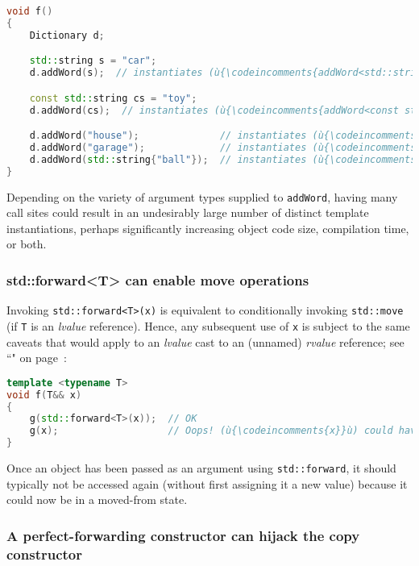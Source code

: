 \begin{lstlisting}[language=C++]
void f()
{
    Dictionary d;

    std::string s = "car";
    d.addWord(s);  // instantiates (ù{\codeincomments{addWord<std::string\&>}}ù)

    const std::string cs = "toy";
    d.addWord(cs);  // instantiates (ù{\codeincomments{addWord<const std::string\&>}}ù)

    d.addWord("house");              // instantiates (ù{\codeincomments{addWord<char const(\&)[6]>}}ù)
    d.addWord("garage");             // instantiates (ù{\codeincomments{addWord<char const(\&)[7]>}}ù)
    d.addWord(std::string{"ball"});  // instantiates (ù{\codeincomments{addWord<std::string\&\&>}}ù)
}
\end{lstlisting}
    
\noindent Depending on the variety of argument types supplied to \texttt{addWord},
having many call sites could result in an undesirably large number of
distinct template instantiations, perhaps significantly increasing
object code size, compilation time, or both.

\subsubsection[{\tt std::forward<T>} can enable move operations]{{\SubsubsecCode std::forward<T>} can enable move operations}\label{std::forward<t>-can-enable-move-operations}

Invoking \texttt{std::forward<T>(x)} is equivalent to conditionally
invoking \texttt{std::move} (if \texttt{T} is an
\emph{lvalue} reference). Hence, any subsequent use of \texttt{x} is
subject to the same caveats that would apply to an \emph{lvalue} cast to
an (unnamed) \emph{rvalue} reference; see ``" on page~\pageref{Rvalue-References}:

\begin{lstlisting}[language=C++]
template <typename T>
void f(T&& x)
{
    g(std::forward<T>(x));  // OK
    g(x);                   // Oops! (ù{\codeincomments{x}}ù) could have already been moved from.
}
\end{lstlisting}
    
\noindent Once an object has been passed as an argument using
\texttt{std::forward}, it should typically not be accessed again
(without first assigning it a new value) because it could now be in a
moved-from state.

\subsubsection[A perfect-forwarding constructor can hijack the copy constructor]{A perfect-forwarding constructor can hijack the copy constructor}\label{a-perfect-forwarding-constructor-can-hijack-the-copy-constructor}

